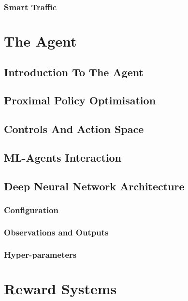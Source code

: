 \documentclass{article}
\begin{document}
\subsubsection{Smart Traffic}
\lipsum[2][1]


\section{The Agent}
\lipsum[2][1]

\subsection{Introduction To The Agent}
\lipsum[2][1]

\subsection{Proximal Policy Optimisation}
\lipsum[2][1]

\subsection{Controls And Action Space}
\lipsum[2][1]

\subsection{ML-Agents Interaction}
\lipsum[2][1]

\subsection{Deep Neural Network Architecture}
\lipsum[2][1]

\subsubsection{Configuration}
\lipsum[2][1]

\subsubsection{Observations and Outputs}
\lipsum[2][1]

\subsubsection{Hyper-parameters}
\lipsum[2][1]


\section{Reward Systems}
\lipsum[2][1]
\end{document}
